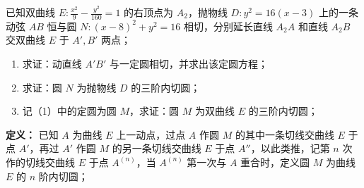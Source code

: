 \begin{exercise}
已知双曲线 \(E: \frac{x^2}{9} - \frac{y^2}{160} = 1\) 的右顶点为 \(A_2\)，抛物线 \(D: y^2 = 16(x - 3)\) 上的一条动弦 \(AB\) 恒与圆 \(N: (x - 8)^2 + y^2 = 16\) 相切，分别延长直线 \(A_2A\) 和直线 \(A_2B\) 交双曲线 \(E\) 于 \(A',B'\) 两点；
\begin{enumerate}
    \item 求证：动直线 \(A'B'\) 与一定圆相切，并求出该定圆方程；
    \item 求证：圆 \(N\) 为抛物线 \(D\) 的三阶内切圆；
    \item 记（1）中的定圆为圆 \(M\)，求证：圆 \(M\) 为双曲线 \(E\) 的三阶内切圆；
\end{enumerate}
\textbf{定义：} 已知 \(A\) 为曲线 \(E\) 上一动点，过点 \(A\) 作圆 \(M\) 的其中一条切线交曲线 \(E\) 于点 \(A'\)，再过 \(A'\) 作圆 \(M\) 的另一条切线交曲线 \(E\) 于点 \(A''\)，以此类推，记第 \(n\) 次作的切线交曲线 \(E\) 于点 \(A^{(n)}\)，当 \(A^{(n)}\) 第一次与 \(A\) 重合时，定义圆 \(M\) 为曲线 \(E\) 的 \(n\) 阶内切圆；
\end{exercise}
